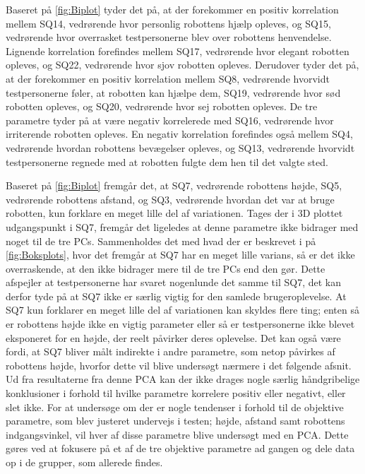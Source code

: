 \noindent
%
Baseret på \autoref{fig:Biplot} tyder det på, at der forekommer en positiv korrelation mellem SQ14, vedrørende hvor personlig robottens hjælp opleves, og SQ15, vedrørende hvor overrasket testpersonerne blev over robottens henvendelse. Lignende korrelation forefindes mellem SQ17, vedrørende hvor elegant robotten opleves, og SQ22, vedrørende hvor sjov robotten opleves. Derudover tyder det på, at der forekommer en positiv korrelation mellem SQ8, vedrørende hvorvidt testpersonerne føler, at robotten kan hjælpe dem, SQ19, vedrørende hvor sød robotten opleves, og SQ20, vedrørende hvor sej robotten opleves. De tre parametre tyder på at være negativ korrelerede med SQ16, vedrørende hvor irriterende robotten opleves. En negativ korrelation forefindes også mellem SQ4, vedrørende hvordan robottens bevægelser opleves, og SQ13, vedrørende hvorvidt testpersonerne regnede med at robotten fulgte dem hen til det valgte sted. 

Baseret på \autoref{fig:Biplot} fremgår det, at SQ7, vedrørende robottens højde, SQ5, vedrørende robottens afstand, og SQ3, vedrørende hvordan det var at bruge robotten, kun forklare en meget lille del af variationen. Tages der i 3D plottet udgangspunkt i SQ7, fremgår det ligeledes at denne parametre ikke bidrager med noget til de tre PCs. Sammenholdes det med hvad der er beskrevet i  på \autoref{fig:Boksplots}, hvor det fremgår at SQ7 har en meget lille varians, så er det ikke overraskende, at den ikke bidrager mere til de tre PCs end den gør. Dette afspejler at testpersonerne har svaret nogenlunde det samme til SQ7, det kan derfor tyde på at SQ7 ikke er særlig vigtig for den samlede brugeroplevelse. At SQ7 kun forklarer en meget lille del af variationen kan skyldes flere ting; enten så er robottens højde ikke en vigtig parameter eller så er testpersonerne ikke blevet eksponeret for en højde, der reelt påvirker deres oplevelse. Det kan også være fordi, at SQ7 bliver målt indirekte i andre parametre, som netop påvirkes af robottens højde, hvorfor dette vil blive undersøgt nærmere i det følgende afsnit.\blankline
%
Ud fra resultaterne fra denne PCA kan der ikke drages nogle særlig håndgribelige konklusioner i forhold til hvilke parametre korrelere positiv eller negativt, eller slet ikke. For at undersøge om der er nogle tendenser i forhold til de objektive parametre, som blev justeret undervejs i testen; højde, afstand samt robottens indgangsvinkel, vil hver af disse parametre blive undersøgt med en PCA. Dette gøres ved at fokusere på et af de tre objektive parametre ad gangen og dele data op i de grupper, som allerede findes.
\newpage